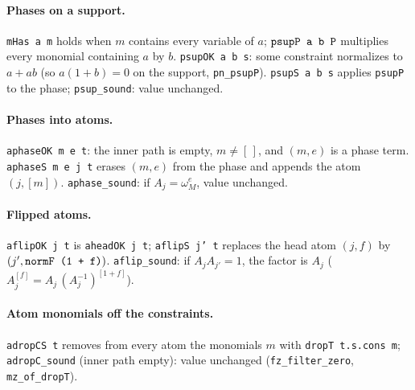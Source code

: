 \paragraph{Phases on a support.} \textnormal{\texttt{mHas a m}} holds when $m$ contains every variable of $a$;
$\textnormal{\texttt{psupP a b P}}$ multiplies every monomial containing $a$ by $b$. \textnormal{\texttt{psupOK a b s}}: some
constraint normalizes to $a+ab$ (so $a(1+b)=0$ on the support, \textnormal{\texttt{pn\_\allowbreak{}psupP}}).
\textnormal{\texttt{psupS a b s}} applies \textnormal{\texttt{psupP}} to the phase; \textnormal{\texttt{psup\_\allowbreak{}sound}}: value unchanged.

\paragraph{Phases into atoms.} \textnormal{\texttt{aphaseOK m e t}}: the inner path is empty, $m\ne[\,]$, and
$(m,e)$ is a phase term. \textnormal{\texttt{aphaseS m e j t}} erases $(m,e)$ from the phase and appends the
atom $(j,[m])$. \textnormal{\texttt{aphase\_\allowbreak{}sound}}: if $A_j=\omega_M^e$, value unchanged.

\paragraph{Flipped atoms.} \textnormal{\texttt{aflipOK j t}} is \textnormal{\texttt{aheadOK j t}}; \textnormal{\texttt{aflipS j' t}} replaces the
head atom $(j,f)$ by $(j',\textnormal{\texttt{normF (\allowbreak{}1 + f)}})$. \textnormal{\texttt{aflip\_\allowbreak{}sound}}: if $A_jA_{j'} = 1$, the factor
is $A_j$ ($A_j^{[f]} = A_j\,(A_j^{-1})^{[1+f]}$).

\paragraph{Atom monomials off the constraints.} \textnormal{\texttt{adropCS t}} removes from every atom the
monomials $m$ with \textnormal{\texttt{dropT t.\allowbreak{}s.\allowbreak{}cons m}}; \textnormal{\texttt{adropC\_\allowbreak{}sound}} (inner path empty): value unchanged
(\textnormal{\texttt{fz\_\allowbreak{}filter\_\allowbreak{}zero}}, \textnormal{\texttt{mz\_\allowbreak{}of\_\allowbreak{}dropT}}).

